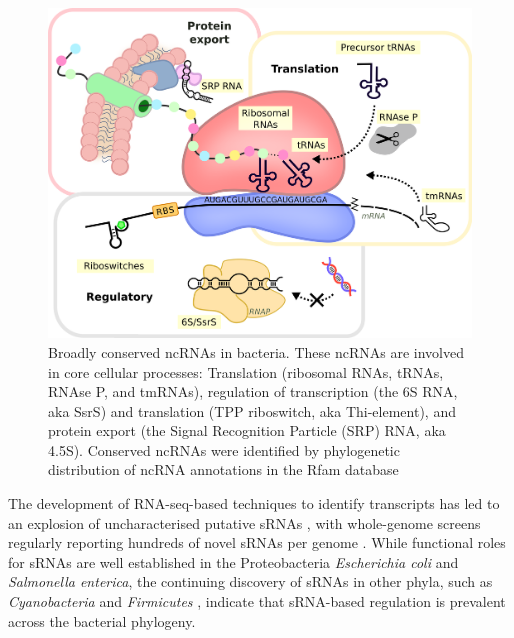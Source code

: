 \begin{figure}[H]
  \includegraphics[scale=0.8]{lit_review/conserved_rnas_final_2.png}
  \caption{ Broadly conserved ncRNAs in bacteria. These ncRNAs are involved in core cellular processes: Translation (ribosomal RNAs, tRNAs, RNAse P, and tmRNAs), regulation of transcription (the 6S RNA, aka SsrS) and translation (TPP riboswitch, aka Thi-element), and protein export (the Signal Recognition Particle (SRP) RNA, aka 4.5S). Conserved ncRNAs were identified by phylogenetic distribution of ncRNA annotations in the Rfam database \citep{Hoeppner2012-pl}}
  \label{fig:conserved_rnas}
\end{figure}

The development of RNA-seq-based techniques to identify transcripts has led to an explosion of uncharacterised putative sRNAs \citep{Barquist2015-ta}, with whole-genome screens regularly reporting hundreds of novel sRNAs per genome \citep{Miotto2012-uw,Gomez-Lozano2015-yx,Kroger2012-jq,Rau2015-gt}. While functional roles for sRNAs are well established in the Proteobacteria \textit{Escherichia coli} and \textit{Salmonella enterica}, the continuing discovery of sRNAs in other phyla, such as \textit{Cyanobacteria} \citep{Klahn2015-pv} and \textit{Firmicutes} \citep{Durand2017-bc}, indicate that sRNA-based regulation is prevalent across the bacterial phylogeny. \par

